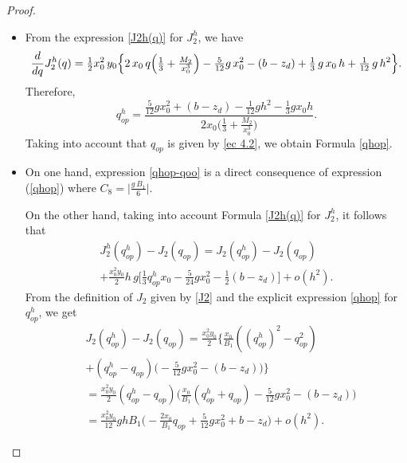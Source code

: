 \documentclass[11pt]{article}
\begin{document}
  \begin{proof}$ $
  \begin{itemize}
  \item[(a)] From the expression \eqref{J2h(q)} for ${J^h_2}$, we have
\begin{equation*}  
 { \frac{d}{dq} J^h_{2}(q)}= \tfrac{1}{2} x_0^2\, y_0 \Big\{ 2\,x_0 \,q \Big(\tfrac{1}{3} + \tfrac{M_2}{x_0^3} \Big) - \tfrac{5}{12} g \,x_0^2 - (b- z_d)  \\   
     +\tfrac{1}{3} \,g \,x_0\,  h+ \tfrac{1}{12} \,g \,h^2 \Big\}.
     \end{equation*} 
Therefore, $${q^h_{op}}= \frac{\tfrac{5}{12} g x_0^2+ (b-z_d)-\tfrac{1}{12} gh^2-\tfrac{1}{3} g x_0 h}{2 x_0 \big(\tfrac{1}{3}+\tfrac{M_2}{x_0^3}\big)}.$$     
   Taking into account that $q_{op}$ is given by \eqref{ec 4.2}, we obtain Formula \eqref{qhop}.
  \item[(b)]


On one hand, expression \eqref{qhop-qoo} is a direct  consequence of expression (\ref{qhop}) where \mbox{$C_8=\Big| \tfrac{g\,  B_1}{6} \Big|.$}
     
On the other hand, taking into account Formula  \eqref{J2h(q)}  for ${J^h_2}$, it follows that
   \begin{equation}\label{48}
   \begin{array}{ll}
  {J^h_2}({q^h_{op}})- J_2(q_{op}) =J_2({q^h_{op}})-J_2(q_{op})\\[0.45cm]
  + \tfrac{x_0^2y_0}{2} h \,g  \Big[\tfrac{1}{3}{q^h_{op}} x_0 - \tfrac{5}{24} g x_0^2 - \tfrac{1}{2} (b-z_d)\Big] +o(h^2).
  \end{array}
\end{equation}  
  From the definition of $J_2$ given by \eqref{J2} and the explicit expression \eqref{qhop} for ${q^h_{op}}$, we get
  \begin{equation}\label{49}
  \begin{array}{lll}
 &J_2({q^h_{op}})-J_2(q_{op})=\tfrac{x_0^2 y_0}{2}\Big\{ \tfrac{x_0}{B_1}({(q^h_{op})}^2-q_{op}^2)\\[0.45cm]
 & +({q^h_{op}}-q_{op})\Big(-\tfrac{5}{12} g x_0^2-  (b-z_d)\Big)\Big\}\\[0.45cm]
 &=\tfrac{x_0^2 y_0}{2} ({q^h_{op}}-q_{op})\Big( \tfrac{x_0}{B_1}({q^h_{op}}+q_{op}) -\tfrac{5}{12} g x_0^2-  (b-z_d)\Big)\\[0.45cm]
 &=\tfrac{x_0^2 y_0}{12}g h B_1 \Big(-\tfrac{2x_0}{B_1} q_{op} +\tfrac{5}{12} g x_0^2+  b-z_d\Big) +o(h^2).
 \end{array}
  \end{equation}
  

\end{itemize}
\end{proof}
\end{document}
